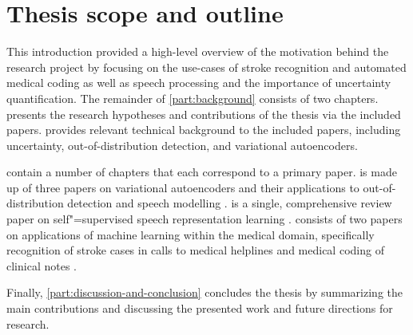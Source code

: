 \section{Thesis scope and outline}

This introduction provided a high-level overview of the motivation behind the research project by focusing on the use-cases of stroke recognition and automated medical coding as well as speech processing and the importance of uncertainty quantification. 
The remainder of \cref{part:background} consists of two chapters. 
 presents the research hypotheses and contributions of the thesis via the included papers. 
 provides relevant technical background to the included papers, including uncertainty, out-of-distribution detection, and variational autoencoders. 

 contain a number of chapters that each correspond to a primary paper. 
 is made up of three papers on variational autoencoders and their applications to out-of-distribution detection and speech modelling \parencite{havtorn_hierarchical_2021,havtorn_benchmarking_2022,bergamin_modelagnostic_2022}. 
 is a single, comprehensive review paper on self"=supervised speech representation learning \parencite{mohamed_selfsupervised_2022}. 
 consists of two papers on applications of machine learning within the medical domain, specifically recognition of stroke cases in calls to medical helplines \parencite{wenstrup_retrospective_2023} and medical coding of clinical notes \parencite{edin_automated_2023}. 

Finally, \cref{part:discussion-and-conclusion} concludes the thesis by summarizing the main contributions and discussing the presented work and future directions for research.
